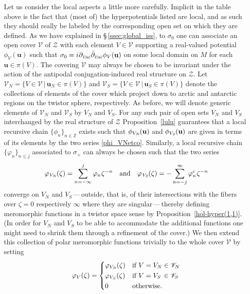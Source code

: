 \documentclass[11pt]{amsart}
\theoremstyle{remark}
\theoremstyle{remark}
\theoremstyle{definition}
\theoremstyle{definition}
\theoremstyle{definition}
\newcommand{\Iu}{\scriptscriptstyle{I\nhp(\nhp\mathbf{u}\hspace{-0.25pt})}} %
\newcommand{\0}{{\scriptstyle 0'}} %
\newcommand{\1}{{\scriptstyle 1'}}
\newcommand{\hp}{\hspace{0.5pt}} %
\newcommand{\npt}{\hspace{-1pt}} %
\newcommand{\nhp}{\hspace{-0.5pt}} %
\begin{document}
Let us consider the local aspects a little more carefully. Implicit in the table above is the fact that (most of) the hyperpotentials listed are local, and as such they should really be labeled by the corresponding open set on which they are defined. As we have explained in \mbox{\S\,\ref{ssec:global_iss}}, to $\sigma_0$ one can associate an open cover $\mathscr{V}$ of $\mathcal{Z}$ with each element $V \in \mathscr{V}$ supporting a real-valued potential $\phi_V(\mathbf{u})$ such that  \mbox{$\sigma_0 = i \hp \partial_{\Iu} \bar{\partial}_{\Iu} \phi_V(\mathbf{u})$} on some local domain on $M$ for each $\mathbf{u} \in \pi(V)$. The covering $\mathscr{V}$ may always be chosen to be invariant under the action of the antipodal conjugation-induced real structure on $\mathcal{Z}$. Let \mbox{$\mathscr{V}_N = \{ V \in \mathscr{V} \, | \, \mathbf{u}_N \in \pi(V) \}$} and \mbox{$\mathscr{V}_S = \{ V \in \mathscr{V} \, | \, \mathbf{u}_S \in \pi(V) \}$} denote the collections of elements of the cover which project down to arctic and antarctic regions on the twistor sphere, respectively. As before, we will denote generic elements of $\mathscr{V}_N$ and $\mathscr{V}_S$ by $V_N$ and $V_S$. For any such pair of open sets $V_N$ and $V_S$ interchanged by the real structure of $\mathcal{Z}$ Proposition~\ref{lulu} guarantees that a local recursive chain $\{\phi_n\}_{n \in \mathbb{Z}}$ exists such that $\phi_{V_N}\npt(\mathbf{u})$ and $\phi_{V_S}\npt(\mathbf{u})$ are given in terms of its elements by the two series \eqref{phi_VNetco}. Similarly, a local recursive chain $\{\varphi_n\}_{n \leq j}$ associated to $\sigma_+$  can always be chosen such that the two series 
\begin{equation} \label{varphi_NS}
\varphi_{\hp V_N}\npt(\zeta) = \sum_{n=-\infty}^j \varphi_n \hp \zeta^{-n}
\quad \text{and} \quad
\varphi_{\hp V_S}\npt(\zeta) = - \sum_{n=-j}^{\infty} \varphi^c_n \hp \zeta^{-n}
\end{equation}
converge on $V_N$ and $V_S$\,---\,outside, that is, of their intersections with the fibers over $\zeta = 0$ respectively $\infty$ where they are singular\,---\,thereby defining meromorphic functions in a twistor space sense by Proposition~\ref{hol-hyper(1,1)}. (In order for $V_N$ and $V_S$ to be able to accommodate the additional functions one might need to shrink them through a refinement of the cover.) We then extend this collection of polar meromorphic functions trivially to the whole cover $\mathscr{V}$ by setting
\begin{equation}
\varphi_V(\zeta) =
\begin{cases}
\varphi_{V_N\npt}(\zeta) & \text{if $V=V_N \in \mathscr{V}_N$} \\[1pt]
\varphi_{V_S}(\zeta) & \text{if $V=V_S \, \in \mathscr{V}_S$} \\[1pt]
0 & \text{otherwise} \rlap{.}
\end{cases}
\end{equation} 
\end{document}
